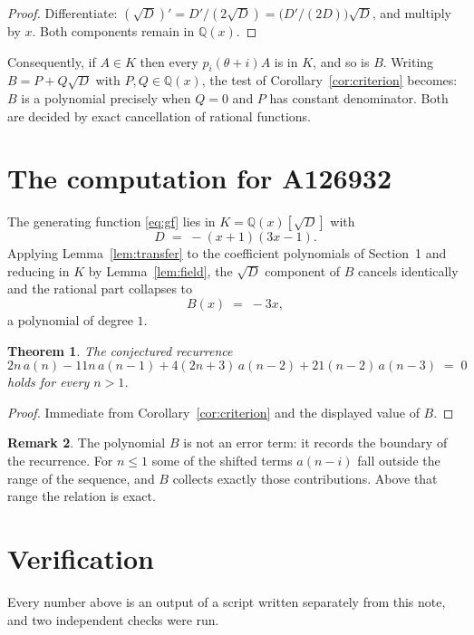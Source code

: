 \documentclass[11pt,a4paper]{article}
\theoremstyle{plain}
\newtheorem{theorem}{Theorem}
\theoremstyle{definition}
\newtheorem{remark}[theorem]{Remark}
\begin{document}
\begin{proof}
Differentiate: $(\sqrt{D})'=D'/(2\sqrt{D})=\bigl(D'/(2D)\bigr)\sqrt{D}$, and multiply by
$x$. Both components remain in $\mathbb{Q}(x)$.
\end{proof}

Consequently, if $A\in K$ then every $p_{i}(\theta+i)A$ is in $K$, and so is $B$. Writing
$B=P+Q\sqrt{D}$ with $P,Q\in\mathbb{Q}(x)$, the test of Corollary~\ref{cor:criterion}
becomes: $B$ is a polynomial precisely when $Q=0$ and $P$ has constant denominator. Both
are decided by exact cancellation of rational functions.

\section{The computation for A126932}

The generating function \eqref{eq:gf} lies in $K=\mathbb{Q}(x)[\sqrt{D}]$ with
\[
D \;=\; - \left(x + 1\right) \left(3 x - 1\right) .
\]
Applying Lemma~\ref{lem:transfer} to the coefficient polynomials of Section~1 and reducing
in $K$ by Lemma~\ref{lem:field}, the $\sqrt{D}$ component of $B$ cancels identically and
the rational part collapses to
\[
B(x)\;=\;- 3 x ,
\]
a polynomial of degree $1$.

\begin{theorem}
The conjectured recurrence
\[
2 n\,a(n) -  11 n\,a(n-1) + 4 \left(2 n + 3\right)\,a(n-2) + 21 \left(n - 2\right)\,a(n-3) \;=\;0
\]
holds for every $n>1$.
\end{theorem}

\begin{proof}
Immediate from Corollary~\ref{cor:criterion} and the displayed value of $B$.
\end{proof}

\begin{remark}
The polynomial $B$ is not an error term: it records the boundary of the recurrence. For
$n\le1$ some of the shifted terms $a(n-i)$ fall outside the range of the sequence,
and $B$ collects exactly those contributions. Above that range the relation is exact.
\end{remark}

\section{Verification}

Every number above is an output of a script written separately from this note, and two
independent checks were run.
\end{document}
